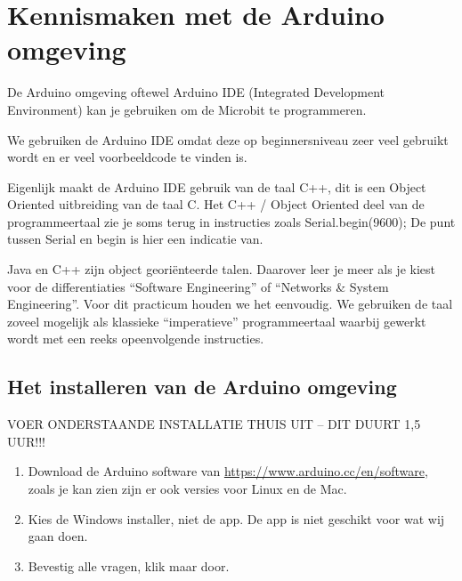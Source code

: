
\section{Kennismaken met de Arduino omgeving}

De Arduino omgeving oftewel Arduino IDE (Integrated Development Environment) kan je gebruiken om de Microbit te programmeren. 

We gebruiken de Arduino IDE omdat deze op beginnersniveau zeer veel gebruikt wordt en er veel voorbeeldcode te vinden is.
 
Eigenlijk maakt de Arduino IDE gebruik van de taal C++, dit is een Object Oriented uitbreiding van de taal C. Het C++ / Object Oriented deel van de programmeertaal zie je soms terug in instructies zoals Serial.begin(9600); De punt tussen Serial en begin is hier een indicatie van.

Java en C++ zijn object georiënteerde talen. Daarover leer je meer als je kiest voor de differentiaties “Software Engineering” of “Networks \& System Engineering”. Voor dit practicum houden we het eenvoudig. We gebruiken de taal zoveel mogelijk als klassieke “imperatieve” programmeertaal waarbij gewerkt wordt met een reeks opeenvolgende instructies.




\subsection{Het installeren van de Arduino omgeving}

VOER ONDERSTAANDE INSTALLATIE THUIS UIT – DIT DUURT 1,5 UUR!!!

\begin{enumerate}
	\item Download de Arduino software van \href{https://https://www.arduino.cc/en/software}{https://www.arduino.cc/en/software}, zoals je kan zien zijn er ook versies voor Linux en de Mac.
	\item Kies de Windows installer, niet de app. De app is niet geschikt voor wat wij gaan doen.
	\item  Bevestig alle vragen, klik maar door.
\end{enumerate}

